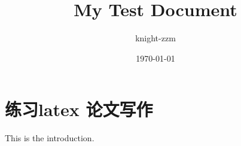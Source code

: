\documentclass[a4paper,12pt]{article}
\begin{document}
\title{My Test Document}
\author{knight-zzm}
\date{\today}
\maketitle
\newpage
\section{练习latex 论文写作}
This is the introduction.

\end{document}
